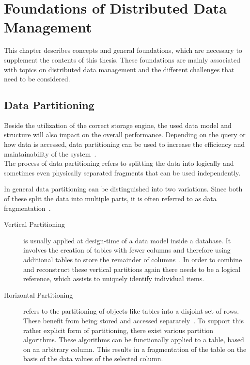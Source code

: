 \chapter{Foundations of Distributed Data Management}
\label{c:Foundation}

This chapter describes concepts and general foundations, which are necessary to supplement 
the contents of this thesis. These foundations are mainly associated with topics on distributed data management
and the different challenges that need to be considered.




\section{Data Partitioning}
\label{sec:part}

Beside the utilization of the correct storage engine, the used data model and structure 
will also impact on the overall performance. Depending on the query or 
how data is accessed, data partitioning can be used to increase the efficiency and 
maintainability of the system~\cite{Agrawal_2004}.\\
The process of data partitioning refers to splitting the data into logically and sometimes even
physically separated fragments that can be used independently.

In general data partitioning can be distinguished into two variations.
Since both of these split the data into multiple parts, it is often referred to as data fragmentation~\cite{tamer:2005}. 

\begin{description}
    \item [Vertical Partitioning] is usually applied at design-time of a data model inside a 
    database. It involves the creation of tables with fewer columns and therefore using additional 
    tables to store the remainder of columns~\cite{vertical_1984, normalization_2012}.
    In order to combine and reconstruct these vertical partitions again there needs to be a logical reference,
    which assists to uniquely identify individual items. 
    \item [Horizontal Partitioning] refers to the partitioning of objects like tables 
    into a disjoint set of rows. These benefit from being stored and accessed separately~\cite{horizontal_1982}.
    To support this rather explicit form of partitioning, there exist various partition algorithms.
    These algorithms can be functionally applied to a table, based on an arbitrary column. 
    This results in a fragmentation of the table on the basis of the data values of the selected column.
\end{description}

